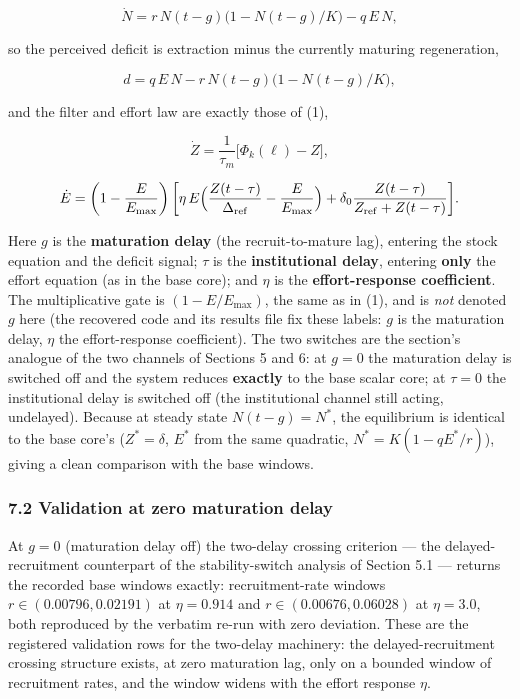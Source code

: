 \documentclass[11pt]{article}
\begin{document}
\[\dot N = r\,N(t-g)\bigl(1-N(t-g)/K\bigr) - q\,E\,N,\]

so the perceived deficit is extraction minus the currently maturing
regeneration,

\[d = q\,E\,N - r\,N(t-g)\bigl(1-N(t-g)/K\bigr),\]

and the filter and effort law are exactly those of (1),

\[\dot Z = \frac{1}{\tau_m}\bigl[\Phi_k(\ell)-Z\bigr],\]

\[\dot E = \left(1-\frac{E}{E_{\max}}\right)\biggl[\eta\,E\Bigl(\frac{Z(t-\tau)}{\Delta_{\mathrm{ref}}}-\frac{E}{E_{\max}}\Bigr)+\delta_0\frac{Z(t-\tau)}{Z_{\mathrm{ref}}+Z(t-\tau)}\biggr].\]

Here \(g\) is the \textbf{maturation delay} (the recruit-to-mature lag),
entering the stock equation and the deficit signal; \(\tau\) is the
\textbf{institutional delay}, entering \textbf{only} the effort equation
(as in the base core); and \(\eta\) is the \textbf{effort-response
coefficient}. The multiplicative gate is \((1-E/E_{\max})\), the same as
in (1), and is \emph{not} denoted \(g\) here (the recovered code and its
results file fix these labels: \(g\) is the maturation delay, \(\eta\)
the effort-response coefficient). The two switches are the section's
analogue of the two channels of Sections 5 and 6: at \(g = 0\) the
maturation delay is switched off and the system reduces \textbf{exactly}
to the base scalar core; at \(\tau = 0\) the institutional delay is
switched off (the institutional channel still acting, undelayed).
Because at steady state \(N(t-g)=N^*\), the equilibrium is identical to
the base core's (\(Z^*=\delta\), \(E^*\) from the same quadratic,
\(N^*=K(1-qE^*/r)\)), giving a clean comparison with the base windows.

\subsubsection{7.2 Validation at zero maturation
delay}\label{validation-at-zero-maturation-delay}

At \(g = 0\) (maturation delay off) the two-delay crossing criterion ---
the delayed-recruitment counterpart of the stability-switch analysis of
Section 5.1 --- returns the recorded base windows exactly:
recruitment-rate windows \(r \in (0.00796, 0.02191)\) at
\(\eta = 0.914\) and \(r \in (0.00676, 0.06028)\) at \(\eta = 3.0\),
both reproduced by the verbatim re-run with zero deviation. These are
the registered validation rows for the two-delay machinery: the
delayed-recruitment crossing structure exists, at zero maturation lag,
only on a bounded window of recruitment rates, and the window widens
with the effort response \(\eta\).
\end{document}

